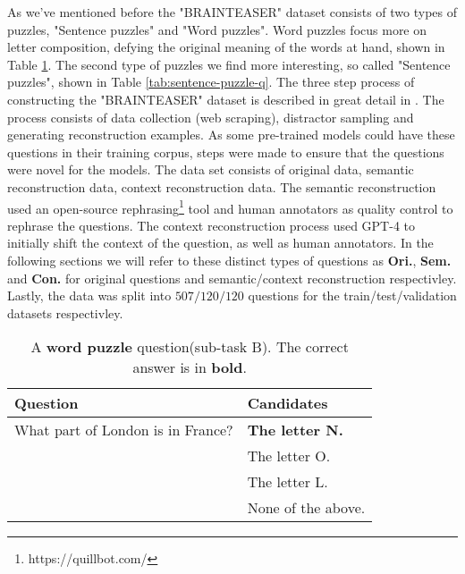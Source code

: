 As we've mentioned before the "BRAINTEASER" dataset consists of two types of puzzles, "Sentence puzzles"
and "Word puzzles".  Word puzzles focus more on letter composition, defying the original meaning
of the words at hand, shown in Table \ref{tab:word-puzzle-q}. 
The second type of puzzles we find more interesting, so called "Sentence puzzles", shown in Table
\ref{tab:sentence-puzzle-q}. The three step process of constructing the "BRAINTEASER" dataset
is described in great detail in \citep{semeval}. The process consists of data collection
(web scraping),
distractor sampling and generating reconstruction examples. As some pre-trained models could have
these questions in their training corpus, steps were made to ensure that the questions were novel
for the models.  The data set consists of original data, semantic reconstruction data, context
reconstruction data. The semantic reconstruction used an open-source rephrasing\footnote[2]{https://quillbot.com/} tool and 
human annotators as quality control to rephrase the questions. The context reconstruction process
used GPT-4 to initially shift the context of the question, as well as human annotators. In the 
following sections we will refer to these distinct types of questions as \textbf{Ori.},
\textbf{Sem.} and 
\textbf{Con.} for original questions and semantic/context reconstruction respectivley. Lastly, the
data was split into $507/120/120$ questions for the train/test/validation datasets respectivley.
  

\begin{table}
	\caption{A \textbf{word puzzle} question(sub-task B). The correct answer is in \textbf{bold}.}
	\label{tab:word-puzzle-q}
	\begin{center}
		\begin{tabular}{|p{3.5cm}|p{3.5cm}|}
			\toprule
			Question                          & Candidates             \\
			\midrule
			What part of London is in France? & \textbf{The letter N.} \\
			                                  & The letter O.          \\
			                                  & The letter L.           \\
			                                  & None of the above.      \\
			\bottomrule
		\end{tabular}
	\end{center}
\end{table}




